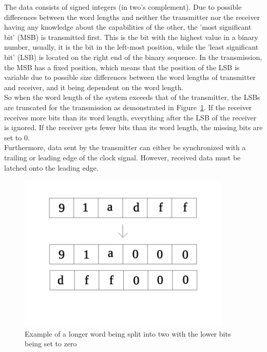 The data consists of signed integers (in two's complement).
Due to possible differences between the word lengths and neither the transmitter nor the
receiver having any knowledge about the capabilities of the other, the 'most significant bit' (MSB) is transmitted first.
This is the bit with the highest value in a binary number, usually, it is the bit in the left-most position,
while the 'least significant bit' (LSB) is located on the right end of the binary sequence.
In the transmission, the MSB has a fixed position, which means that the position of the LSB
is variable due to possible size differences between the word lengths of transmitter and receiver,
and it being dependent on the word length.\\
So when the word length of the system exceeds that of the transmitter, the LSBs are truncated
for the transmission as demonstrated in Figure~\ref{fig:truncation}.
If the receiver receives more bits than its word length, everything after the LSB
of the receiver is ignored.
If the receiver gets fewer bits than its word length, the missing bits are set to 0.\\
Furthermore, data sent by the transmitter can either be synchronized with a trailing or leading edge
of the clock signal. However, received data must be latched onto the leading edge.


\begin{figure}[htb]
    \centering
    \includegraphics[width=0.9\textwidth]{figures/fundamentals_truncation.png}
    \caption[Illustration: Truncation of words]{Example of a longer word being split into two with the lower bits being set to zero}
    \label{fig:truncation}
\end{figure}

